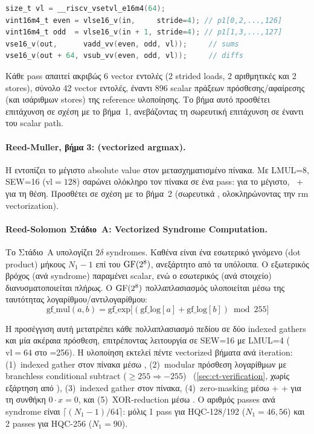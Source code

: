 \begin{lstlisting}[language=C, caption={Vectorized FHT butterfly pass.},
  label={lst:hadamard-rvv}]
size_t vl = __riscv_vsetvl_e16m4(64);
vint16m4_t even = vlse16_v(in,     stride=4); // p1[0,2,...,126]
vint16m4_t odd  = vlse16_v(in + 1, stride=4); // p1[1,3,...,127]
vse16_v(out,      vadd_vv(even, odd, vl));     // sums
vse16_v(out + 64, vsub_vv(even, odd, vl));     // diffs
\end{lstlisting}

Κάθε pass απαιτεί ακριβώς \num{6} vector εντολές (2 strided loads, 2
αριθμητικές και 2 stores), σύνολο \num{42} vector εντολές, 
έναντι \num{896} scalar πράξεων πρόσθεσης/αφαίρεσης (και
ισάριθμων stores) της reference υλοποίησης. Το βήμα αυτό προσθέτει επιτάχυνση
 σε σχέση με το βήμα~1, ανεβάζοντας τη σωρευτική επιτάχυνση σε
 έναντι του scalar path.

\paragraph{Reed-Muller, βήμα 3:  (vectorized argmax).}
Η  εντοπίζει το μέγιστο absolute value στον μετασχηματισμένο 
πίνακα. Με LMUL=8, SEW=16 ($\text{vl}=128$)
σαρώνει ολόκληρο τον πίνακα σε ένα pass:  για το μέγιστο,
~+~ για τη θέση. Προσθέτει  σε σχέση 
με το βήμα~2 (σωρευτικά , ολοκληρώνοντας την \gls{rm}
vectorization).

\paragraph{Reed-Solomon Στάδιο~A: Vectorized Syndrome Computation.}
Το Στάδιο~A υπολογίζει $2\delta$ syndromes. Καθένα είναι ένα εσωτερικό γινόμενο 
(dot product) μήκους $N_1 - 1$ επί του $\mathrm{GF}(2^8)$, ανεξάρτητο από τα 
υπόλοιπα. Ο εξωτερικός βρόχος (ανά
syndrome) παραμένει scalar, ενώ ο εσωτερικός (ανά στοιχείο) διανυσματοποιείται
πλήρως. Ο $\mathrm{GF}(2^8)$ πολλαπλασιασμός υλοποιείται μέσω της ταυτότητας
λογαρίθμου/αντιλογαρίθμου:
\begin{equation}
  \text{gf\_mul}(a, b) = \text{gf\_exp}\bigl[(\text{gf\_log}[a] + \text{gf\_log}[b]) \bmod 255\bigr]
\end{equation}
%

Η προσέγγιση αυτή μετατρέπει κάθε πολλαπλασιασμό πεδίου σε δύο indexed gathers
και μία ακέραια πρόσθεση, επιτρέποντας λειτουργία σε SEW=16 με LMUL=4
($\text{vl}=64$ στο \VLEN{}=\num{256}). Η υλοποίηση εκτελεί πέντε vectorized βήματα ανά iteration:
(1)~indexed gather στον  πίνακα μέσω ,
(2)~modular πρόσθεση λογαρίθμων με branchless conditional subtract
($\geq 255 \Rightarrow -255$)\ifTODO~%
(\cref{sec:ct-verification}, χωρίς εξάρτηση από )\fi,
(3)~indexed gather στον  πίνακα, (4)~zero-masking μέσω
 +  +  για τη συνθήκη $0 \cdot x = 0$, και
(5)~XOR-reduction μέσω . Ο αριθμός passes ανά syndrome είναι
$\lceil (N_1 - 1) / 64 \rceil$: μόλις \num{1} pass για HQC-128/192
($N_1 = 46, 56$) και \num{2} passes για HQC-256 ($N_1 = 90$).

